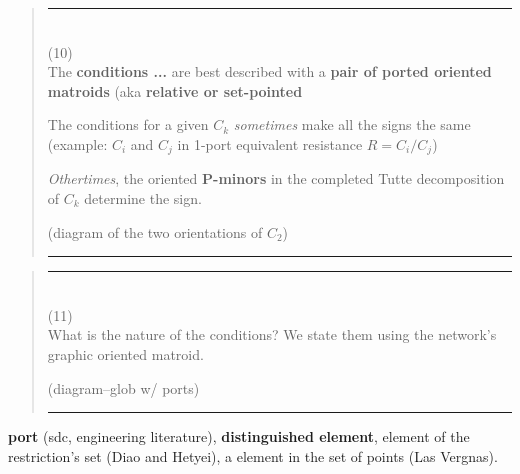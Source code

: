 \documentclass{article}
\begin{document}
\pagebreak[3] \begin{quote}\rule{\textwidth}{3pt}\\
(10)\\
The \textbf{conditions ...} are best described with 
a \textbf{pair of ported oriented matroids}
(aka \textbf{relative or set-pointed}

The conditions for a given $C_k$ \textit{sometimes}
make all the signs the same (example: $C_i$ and 
$C_j$ in 1-port equivalent resistance $R=C_i/C_j$)

\textit{Othertimes}, the oriented \textbf{P-minors}
in the completed Tutte decomposition of $C_k$ determine
the sign.

(diagram of the two orientations of $C_2$)

\rule{\textwidth}{3pt}
\end{quote}

\pagebreak[3] \begin{quote}\rule{\textwidth}{3pt}\\
(11)\\
What is the nature of the conditions?  We state them using the 
network's graphic oriented matroid.

(diagram--glob w/ ports)

\rule{\textwidth}{3pt}
\end{quote}

\textbf{port} (sdc, engineering literature), 
\textbf{distinguished element}, 
element of the restriction's set (Diao and Hetyei), 
a element in the set of points (Las Vergnas).
\end{document}
